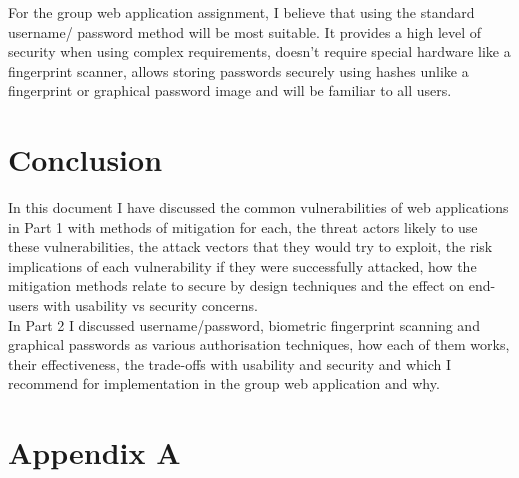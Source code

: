 \documentclass{ueacmpstyle}
\begin{document}
    For the group web application assignment, I believe that using the standard username/
    password method will be most suitable. It provides a high level of security when using 
    complex requirements, doesn't require special hardware like a fingerprint scanner, allows 
    storing passwords securely using hashes unlike a fingerprint or graphical password image 
    and will be familiar to all users. 

    \section{Conclusion}\label{sec:Con}
    In this document I have discussed the common vulnerabilities of web applications in Part 1 
    with methods of mitigation for each, the threat actors likely to use these vulnerabilities, the attack 
    vectors that they would try to exploit, the risk implications of each vulnerability if 
    they were successfully attacked, how the mitigation methods relate to secure by design 
    techniques and the effect on end-users with usability vs security concerns.
    \\
    In Part 2 I discussed username/password, biometric fingerprint scanning and graphical 
    passwords as various authorisation techniques, how each of them works, their effectiveness, 
    the trade-offs with usability and security and which I recommend for implementation in 
    the group web application and why.
    
    

  \newpage

	
	
	\newpage
	
	\appendix
        \section{Appendix A}\label{app:A}   %
\end{document}
